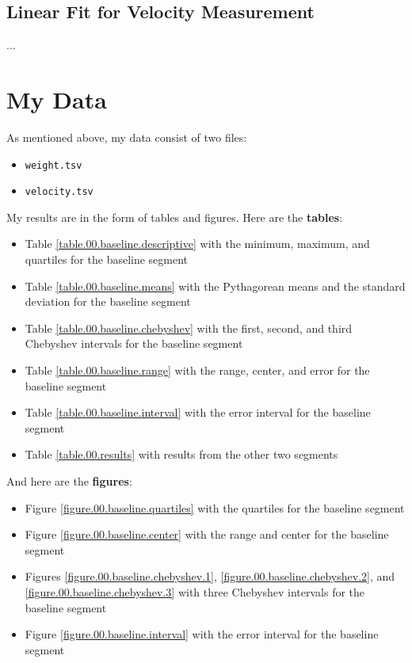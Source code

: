 \subsection{Linear Fit for Velocity Measurement}
...
\section{My Data}
As mentioned above, my data consist of two files:
\begin{itemize}
    \item \texttt{weight.tsv}
    \item \texttt{velocity.tsv}
\end{itemize}
My results are in the form of tables and figures. Here are the \textbf{tables}:
\begin{itemize}
    \item Table \ref{table.00.baseline.descriptive} with the minimum, maximum, and quartiles for the baseline segment
    \item Table \ref{table.00.baseline.means} with the Pythagorean means and the standard deviation for the baseline segment
    \item Table \ref{table.00.baseline.chebyshev} with the first, second, and third Chebyshev intervals for the baseline segment
    \item Table \ref{table.00.baseline.range} with the range, center, and error for the baseline segment
    \item Table \ref{table.00.baseline.interval} with the error interval for the baseline segment
    \item Table \ref{table.00.results} with results from the other two segments
\end{itemize}
And here are the \textbf{figures}:
\begin{itemize}
    \item Figure \ref{figure.00.baseline.quartiles} with the quartiles for the baseline segment
    \item Figure \ref{figure.00.baseline.center} with the range and center for the baseline segment
    \item Figures \ref{figure.00.baseline.chebyshev.1}, \ref{figure.00.baseline.chebyshev.2}, and \ref{figure.00.baseline.chebyshev.3} with three Chebyshev intervals for the baseline segment
    \item Figure \ref{figure.00.baseline.interval} with the error interval for the baseline segment
\end{itemize}
